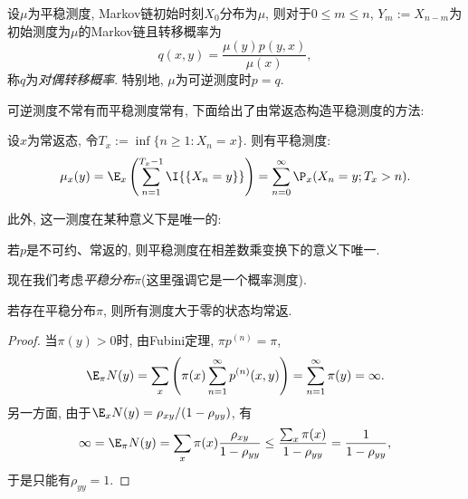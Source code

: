 \documentclass[a4paper, 10pt]{ctexart}
\begin{document}
\begin{theorem}
	设$\mu$为平稳测度, Markov链初始时刻$X_0$分布为$\mu$, 则对于$0 \leq m \leq n$, $Y_m := X_{n-m}$为初始测度为$\mu$的Markov链且转移概率为
	\begin{equation*}
		q(x, y) = \frac{\mu(y) p(y, x)}{\mu(x)},  
	\end{equation*}
	称$q$为\emph{对偶转移概率}. 
	特别地, $\mu$为可逆测度时$p = q$. 
\end{theorem}

可逆测度不常有而平稳测度常有, 下面给出了由常返态构造平稳测度的方法:
\begin{theorem}[平稳测度存在性]\label{thm:ConstructionOfStationaryMeasure}
	设$x$为常返态, 令$T_x := \inf\{n \geq 1 \colon  X_n = x\}$. 
	则有平稳测度: 
	\begin{equation*}
		\mu_x(y) = 
		\E_x \left( \sum_{n=1}^{T_x-1} \I{\{X_n = y\}} \right)
		= \sum_{n = 0}^{\infty} \P_x(X_n = y; T_x > n). 
	\end{equation*}
\end{theorem}
\noindent 此外, 这一测度在某种意义下是唯一的: 
\begin{theorem}[平稳测度唯一性]
	若$p$是不可约、常返的, 则平稳测度在相差数乘变换下的意义下唯一.
\end{theorem}

现在我们考虑\emph{平稳分布}$\pi$(这里强调它是一个概率测度). 
\begin{theorem}\label{thm:PostiveSDimpliesRecurrent}
	若存在平稳分布$\pi$, 则所有测度大于零的状态均常返. 
\end{theorem}
\begin{proof}
	当$\pi(y) > 0$时, 由Fubini定理, $\pi p^{(n)} = \pi$, 
	\begin{align*}
		\E_{\pi} N(y)
		= \sum_x \left( \pi(x) \sum_{n=1}^{\infty} p^{(n)}(x,y) \right)
		= \sum_{n = 1}^{\infty} \pi(y) = \infty.
	\end{align*}
	另一方面, 由于$\E_x N(y) = \rho_{xy} / (1 - \rho_{yy})$, 有
	\begin{equation*}
		\infty 
		= \E_{\pi} N(y) 
		= \sum_x \pi(x) \frac{\rho_{xy}}{1-\rho_{yy}} 
		\leq \frac{\sum_x \pi(x)}{1 - \rho_{yy}}
		= \frac{1}{1 - \rho_{yy}}, 
	\end{equation*}
	于是只能有$\rho_{yy} = 1$. 
\end{proof}
\end{document}
